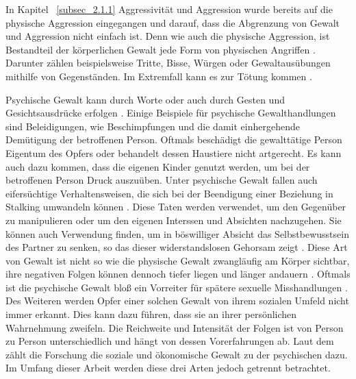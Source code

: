 In Kapitel ~\ref{subsec_2.1.1} Aggressivität und Aggression wurde bereits auf die physische Aggression eingegangen und darauf, dass die Abgrenzung von Gewalt und Aggression nicht einfach ist. Denn wie auch die physische Aggression, ist Bestandteil der körperlichen Gewalt jede Form von physischen Angriffen \parencite{ph_G_wie_aggro}. Darunter zählen beispielsweise Tritte, Bisse, Würgen oder Gewaltausübungen mithilfe von Gegenständen. Im Extremfall kann es zur Tötung kommen \parencite{Gewaltart, Def_haus_Gewalt, physische_Gewalt_wie_aggro, Def_Form_Folge_Gewalt}.

Psychische Gewalt kann durch Worte oder auch durch Gesten und Gesichtsausdrücke erfolgen \parencite{Def_haus_Gewalt_2}. Einige Beispiele für psychische Gewalthandlungen sind Beleidigungen, wie Beschimpfungen und die damit einhergehende Demütigung der betroffenen Person. Oftmals beschädigt die gewalttätige Person Eigentum des Opfers oder behandelt dessen Haustiere nicht artgerecht. Es kann auch dazu kommen, dass die eigenen Kinder genutzt werden, um bei der betroffenen Person Druck auszuüben. Unter psychische Gewalt fallen auch  eifersüchtige Verhaltensweisen, die sich bei der Beendigung einer Beziehung in Stalking umwandeln können \parencite{Def_Form_Folge_Gewalt, Gewaltart, Def_haus_Gewalt_2}. Diese Taten werden verwendet, um den Gegenüber zu manipulieren oder um den eigenen Interssen und Absichten nachzugehen. Sie können auch Verwendung finden, um in böswilliger Absicht das Selbstbewusstsein des Partner zu senken, so das dieser widerstandslosen Gehorsam zeigt \parencite{Def_haus_Gewalt_2}. Diese Art von Gewalt ist nicht so wie die physische Gewalt zwangläufig am Körper sichtbar, ihre negativen Folgen können dennoch tiefer liegen und länger andauern \parencite{psych_Gewalt}. Oftmals ist die psychische Gewalt bloß ein Vorreiter für spätere sexuelle Misshandlungen \parencite{psych_Gewalt_2}. Des Weiteren werden Opfer einer solchen Gewalt von ihrem sozialen Umfeld nicht immer erkannt. Dies kann dazu führen, dass sie an ihrer persönlichen Wahrnehmung zweifeln. Die Reichweite und Intensität der Folgen ist von Person zu Person unterschiedlich und hängt von dessen Vorerfahrungen ab. Laut dem \textcite{Def_Form_Folge_Gewalt} zählt die Forschung die soziale und ökonomische Gewalt zu der psychischen dazu. Im Umfang dieser Arbeit werden diese drei Arten jedoch getrennt betrachtet. 

